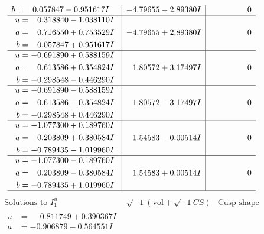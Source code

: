 \documentclass[1p]{elsarticle_modified}
\theoremstyle{definition}
\newcommand{\I}{\sqrt{-1}}
\begin{document}
$$\begin{array}{c|c|c}
\begin{aligned}
b &= \phantom{-}0.057847 - 0.951617 I\end{aligned}
 & -4.79655 - 2.89380 I & \phantom{-0.000000 } 0 \\ \hline\begin{aligned}
u &= \phantom{-}0.318840 - 1.038110 I \\
a &= \phantom{-}0.716550 + 0.753529 I \\
b &= \phantom{-}0.057847 + 0.951617 I\end{aligned}
 & -4.79655 + 2.89380 I & \phantom{-0.000000 } 0 \\ \hline\begin{aligned}
u &= -0.691890 + 0.588159 I \\
a &= \phantom{-}0.613586 + 0.354824 I \\
b &= -0.298548 - 0.446290 I\end{aligned}
 & \phantom{-}1.80572 + 3.17497 I & \phantom{-0.000000 } 0 \\ \hline\begin{aligned}
u &= -0.691890 - 0.588159 I \\
a &= \phantom{-}0.613586 - 0.354824 I \\
b &= -0.298548 + 0.446290 I\end{aligned}
 & \phantom{-}1.80572 - 3.17497 I & \phantom{-0.000000 } 0 \\ \hline\begin{aligned}
u &= -1.077300 + 0.189760 I \\
a &= \phantom{-}0.203809 + 0.380584 I \\
b &= -0.789435 - 1.019960 I\end{aligned}
 & \phantom{-}1.54583 - 0.00514 I & \phantom{-0.000000 } 0 \\ \hline\begin{aligned}
u &= -1.077300 - 0.189760 I \\
a &= \phantom{-}0.203809 - 0.380584 I \\
b &= -0.789435 + 1.019960 I\end{aligned}
 & \phantom{-}1.54583 + 0.00514 I & \phantom{-0.000000 } 0\\
 \hline 
 \end{array}$$\newpage$$\begin{array}{c|c|c}  
\text{Solutions to }I^u_{1}& \I (\text{vol} + \sqrt{-1}CS) & \text{Cusp shape}\\
 \hline 
\begin{aligned}
u &= \phantom{-}0.811749 + 0.390367 I \\
a &= -0.906879 - 0.564551 I \\

\end{aligned}
\end{array}$$
\end{document}
